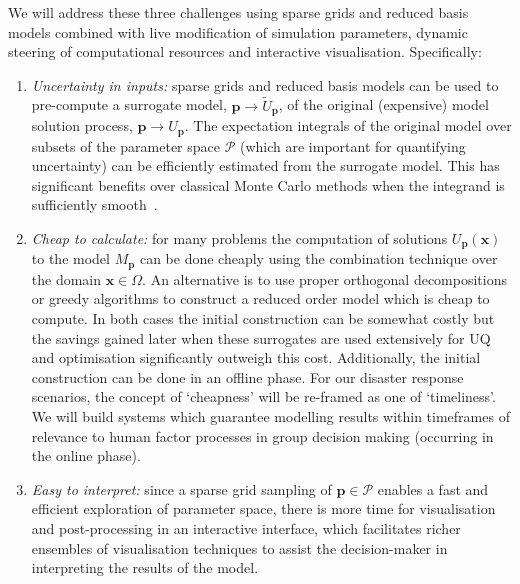 We will address these three challenges using sparse grids and reduced
basis models combined with live modification of simulation parameters,
dynamic steering of computational resources and interactive
visualisation. Specifically:
\begin{enumerate}
\item \emph{Uncertainty in inputs:} sparse grids and reduced basis models can be used
  to pre-compute a surrogate model, $\mathbf{p} \rightarrow \tilde{U}_{\mathbf{p}}$, of the original
  (expensive) model solution process, $\mathbf{p} \rightarrow {U}_{\mathbf{p}}$.
  The expectation integrals of the original model over subsets of the
  parameter space $\mathcal{P}$ (which are important for quantifying
  uncertainty) can be efficiently estimated from the
  surrogate model. This has
  significant benefits over classical Monte Carlo methods when the
  integrand is sufficiently
  smooth~\parencite{JakemanRoberts2013,FranzelinDiehlPfluger2014}.

\item \emph{Cheap to calculate:} for many problems the computation
  of solutions $U_{\mathbf{p}}(\mathbf{x})$ to the model
  $M_{\mathbf{p}}$ can be done cheaply using the combination technique
  over the domain $\mathbf{x}\in\Omega$. An alternative is to use
  proper orthogonal decompositions or greedy algorithms to construct a
  reduced order model which is cheap to compute. In both
  cases the initial construction can be somewhat costly but the
  savings gained later when these surrogates are used extensively for
  UQ and optimisation significantly outweigh this cost. Additionally,
  the initial construction can be done in an offline phase. For our
  disaster response scenarios, the concept of `cheapness' will be
  re-framed as one of `timeliness'. We will build systems which
  guarantee modelling results within timeframes of
  relevance to human factor processes in group decision making
  (occurring in the online phase).

\item \emph{Easy to interpret:} since a sparse grid sampling of
  $\mathbf{p}\in\mathcal{P}$ enables a fast and efficient exploration
  of parameter space, there is more time for visualisation and
  post-processing in an interactive interface, which facilitates
  richer ensembles of visualisation techniques to assist the
  decision-maker in interpreting the results of the model.
\end{enumerate}


